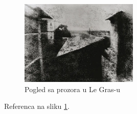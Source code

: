 \documentclass[11pt]{article}
\begin{document}
	\begin{figure}
		\centering
		\includegraphics[width=0.5\textwidth]{pogled.png}
		\caption{Pogled sa prozora u Le Gras-u}
		\label{pogled}
	\end{figure}

	Referenca na sliku \ref{pogled}.
\end{document}
